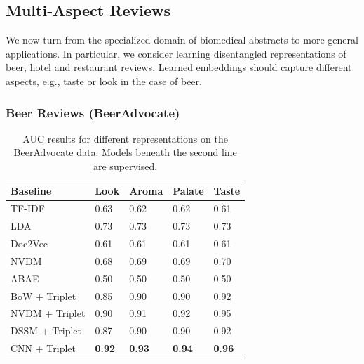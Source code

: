 \documentclass[11pt,a4paper]{article}
\begin{document}
\vspace{-.35em}
\subsection{Multi-Aspect Reviews}
\vspace{-.5em}

We now turn from the specialized domain of biomedical abstracts to more general applications. In particular, we consider learning disentangled representations of beer, hotel and restaurant reviews. Learned embeddings should capture different aspects, e.g., taste or look in the case of beer.

\vspace{-.2em}
\subsubsection{Beer Reviews (BeerAdvocate)}
\vspace{-.25em}
\begin{table}%
\footnotesize
    \centering
    \begin{tabularx}{\columnwidth}{ l X X X X }
     Baseline & Look & Aroma & Palate & Taste  \\
    \hline
    TF-IDF & 0.63 & 0.62 & 0.62 & 0.61  \\
    LDA & 0.73 & 0.73 & 0.73 & 0.73 \\
    Doc2Vec & 0.61 & 0.61 & 0.61 & 0.61  \\
    NVDM & 0.68 & 0.69 & 0.69 & 0.70 \\
    ABAE & 0.50 & 0.50 & 0.50 & 0.50 \\
    \hline
    BoW + Triplet & 0.85 & 0.90 & 0.90 & 0.92 \\
    NVDM + Triplet & 0.90 & 0.91 & 0.92 & 0.95 \\
    DSSM + Triplet &  0.87 & 0.90 & 0.90 & 0.92 \\
    CNN + Triplet & \textbf{0.92} & \textbf{0.93} & \textbf{0.94} & \textbf{0.96} \\
    \end{tabularx}
    \vspace{-1em}
    \caption{AUC results for different representations on the BeerAdvocate data. Models beneath the second line are supervised.}
    \vspace{-.75em}
    \label{table:beerauc}
\end{table}
\end{document}
